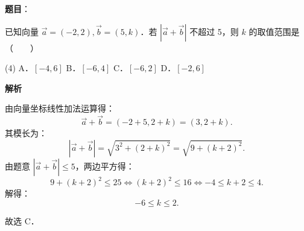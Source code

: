 \begin{answer}

\textbf{题目}：

已知向量 $\vec{a} = (-2, 2), \vec{b} = (5, k)$．若 $|\vec{a} + \vec{b}|$ 不超过 5，则 $k$ 的取值范围是\mbox{（　　）}

\begin{gkopts}(4)
\task A．$[-4, 6]$
\task B．$[-6, 4]$
\task C．$[-6, 2]$
\task D．$[-2, 6]$
\end{gkopts}

\textbf{解析}

由向量坐标线性加法运算得：
\nopagebreak[4]
\[
\vec{a} + \vec{b} = (-2 + 5, 2 + k) = (3, 2 + k).
\]
其模长为：
\nopagebreak[4]
\[
|\vec{a} + \vec{b}| = \sqrt{3^2 + (2 + k)^2} = \sqrt{9 + (k + 2)^2}.
\]
由题意 $|\vec{a} + \vec{b}| \leqslant 5$，两边平方得：
\nopagebreak[4]
\[
9 + (k + 2)^2 \leqslant 25 \iff (k + 2)^2 \leqslant 16 \iff -4 \leqslant k + 2 \leqslant 4.
\]
解得：
\nopagebreak[4]
\[
-6 \leqslant k \leqslant 2.
\]

故选 C．


\end{answer}
